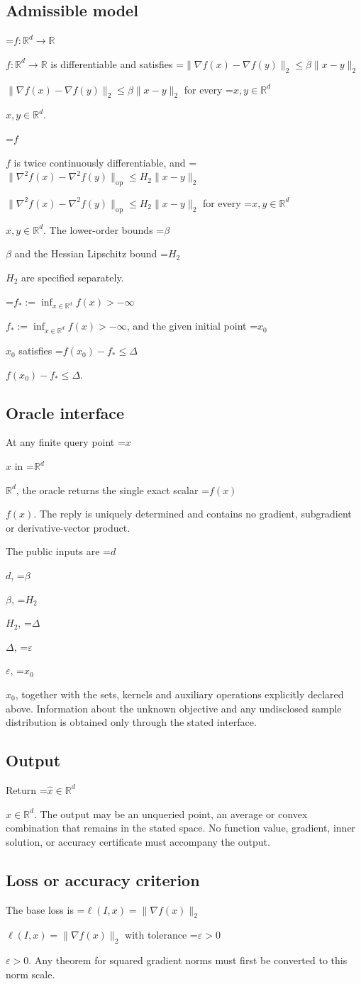 \documentclass[10pt,a4paper]{article}
\newcommand{\AtlasMath}[1]{\par\begingroup\centering\setbox0=\hbox{$\displaystyle #1$}\ifdim\wd0>1.4\linewidth\typeout{ATLAS WIDE FORMULA: \the\wd0}\fi\ifdim\wd0>\linewidth\resizebox{\linewidth}{!}{\box0}\else\box0\fi\par\endgroup}
\newcommand{\AtlasInlineMath}[1]{\begingroup\setbox0=\hbox{$#1$}\ifdim\wd0>.4\linewidth\endgroup\AtlasMath{#1}\else\endgroup$#1$\fi}
\begin{document}
\subsection{Admissible model}
\AtlasInlineMath{f:\mathbb{R}^d\to\mathbb{R}} is differentiable and satisfies \AtlasInlineMath{\|\nabla f(x)-\nabla f(y)\|_2\le\beta\|x-y\|_2} for every \AtlasInlineMath{x,y\in\mathbb{R}^d}.

\AtlasInlineMath{f} is twice continuously differentiable, and \AtlasInlineMath{\|\nabla^2f(x)-\nabla^2f(y)\|_{\mathrm{op}}\le H_2\|x-y\|_2} for every \AtlasInlineMath{x,y\in\mathbb{R}^d}. The lower-order bounds \AtlasInlineMath{\beta} and the Hessian Lipschitz bound \AtlasInlineMath{H_2} are specified separately.

\AtlasInlineMath{f_*:=\inf_{x\in\mathbb{R}^d}f(x)>-\infty}, and the given initial point \AtlasInlineMath{x_0} satisfies \AtlasInlineMath{f(x_0)-f_*\le\Delta}.

\subsection{Oracle interface}
At any finite query point \AtlasInlineMath{x} in \AtlasInlineMath{\mathbb{R}^d}, the oracle returns the single exact scalar \AtlasInlineMath{f(x)}. The reply is uniquely determined and contains no gradient, subgradient or derivative-vector product.

The public inputs are \AtlasInlineMath{d}, \AtlasInlineMath{\beta}, \AtlasInlineMath{H_2}, \AtlasInlineMath{\Delta}, \AtlasInlineMath{\varepsilon}, \AtlasInlineMath{x_0}, together with the sets, kernels and auxiliary operations explicitly declared above. Information about the unknown objective and any undisclosed sample distribution is obtained only through the stated interface.

\subsection{Output}
Return \AtlasInlineMath{\widehat{x}\in \mathbb{R}^d}. The output may be an unqueried point, an average or convex combination that remains in the stated space. No function value, gradient, inner solution, or accuracy certificate must accompany the output.

\subsection{Loss or accuracy criterion}
The base loss is \AtlasInlineMath{\ell(I,x)=\|\nabla f(x)\|_2} with tolerance \AtlasInlineMath{\varepsilon>0}. Any theorem for squared gradient norms must first be converted to this norm scale.
\end{document}
